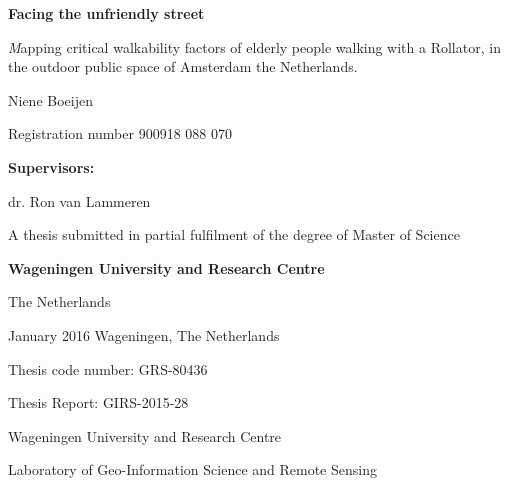 \documentclass[10pt,a4paper, titlepage, onecolumn, openright, twoside, justified, parskip=full, fleqn, abstract, unicode=true, pdfencoding=auto,x11names, noindent, BCOR=-0.2mm, DIV=calc]{scrreprt}  %
\begin{document}
	\begin{titlepage}
		\begin{center}
			\LARGE \textbf{Facing the unfriendly street}
			\vspace*{0.5cm}
			
			\Large\textit Mapping critical walkability factors of elderly people walking with a Rollator, in the outdoor public space of Amsterdam the Netherlands. \par
			
			\vspace*{1.5cm}
			
			Niene Boeijen
			
			Registration number 900918 088 070
			
			\vspace*{1.5cm}
			
			\textbf{Supervisors:}
			
			dr. Ron van Lammeren
			
			\vspace*{1.5cm}
			
			A thesis submitted in partial fulfilment of the degree of Master of Science
			
			\textbf{Wageningen University and Research Centre }
			
			The Netherlands
		\end{center}
		
		\vfill
		
		\begin{flushright}
			January 2016
			Wageningen, The Netherlands
		\end{flushright}
		
		\begin{flushleft}
					Thesis code number: GRS-80436
					
					Thesis Report: GIRS-2015-28			
					
					Wageningen University and Research Centre
					
					Laboratory of Geo-Information Science and Remote Sensing
		\end{flushleft}
		
	\end{titlepage}

	\cleardoublepage
	\tableofcontents
	\listoffigures 
	
	 \cleardoubleevenemptypage
	\listoftables 
	

	\cleardoublepage
	
	 
	 
	 
	
	
	
	
	
	 

	{}
	
	
	\appendix
	
\end{document}
